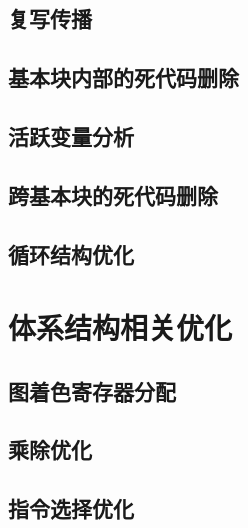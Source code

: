 \subsection{复写传播}

\subsection{基本块内部的死代码删除}

\subsection{活跃变量分析}

\subsection{跨基本块的死代码删除}

\subsection{循环结构优化}

\section{体系结构相关优化}

\subsection{图着色寄存器分配}

\subsection{乘除优化}

\subsection{指令选择优化}